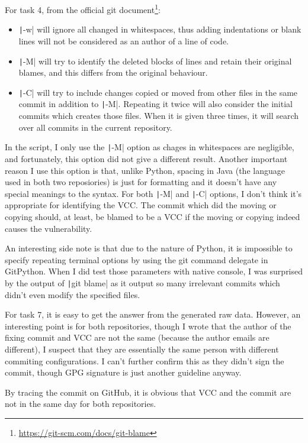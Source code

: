 \documentclass[12pt]{article}
\begin{document}
For task 4, from the official git document\footnote{\url{https://git-scm.com/docs/git-blame}}:
\begin{itemize}
  \item \texttt|-w| will ignore all changed in whitespaces, thus adding indentations or blank lines will not be considered as an author of a line of code.
  \item \texttt|-M| will try to identify the deleted blocks of lines and retain their original blames, and this differs from the original behaviour.
  \item \texttt|-C| will try to include changes copied or moved from other files in the same commit in addition to \texttt|-M|. Repeating it twice will also consider the initial commits which creates those files. When it is given three times, it will search over all commits in the current repository.
\end{itemize}

In the script, I only use the \texttt|-M| option as chages in whitespaces are negligible, and fortunately, this option did not give a different result. Another important reason I use this option is that, unlike Python, spacing in Java (the language used in both two reposiories) is just for formatting and it doesn't have any special meanings to the syntax. For both \texttt|-M| and \texttt|-C| options, I don't think it's appropriate for identifying the VCC. The commit which did the moving or copying should, at least, be blamed to be a VCC if the moving or copying indeed causes the vulnerability.

An interesting side note is that due to the nature of Python, it is impossible to specify repeating terminal options by using the git command delegate in GitPython. When I did test those parameters with native console, I was surprised by the output of \texttt|git blame| as it output so many irrelevant commits which didn't even modify the specified files.

For task 7, it is easy to get the answer from the generated raw data. However, an interesting point is for both repositories, though I wrote that the author of the fixing commit and VCC are not the same (because the author emails are different), I suspect that they are essentially the same person with different commiting configurations. I can't further confirm this as they didn't sign the commit, though GPG signature is just another guideline anyway.

By tracing the commit on GitHub, it is obvious that VCC and the commit are not in the same day for both repositories.
\end{document}
